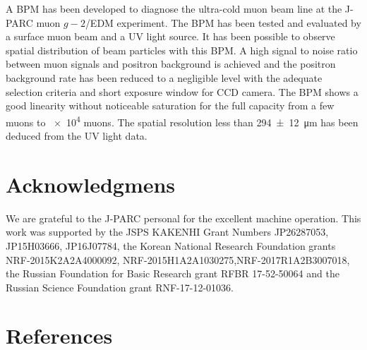 \documentclass[preprint,3p,twocolumn]{elsarticle}
\begin{document}
A BPM has been developed to diagnose the ultra-cold muon beam line at the J-PARC muon $g-2$/EDM experiment. The BPM has been tested and evaluated by a surface muon beam and a UV light source.
It has been possible to observe spatial distribution of beam particles with this BPM.
A high signal to noise ratio between muon signals and positron background is achieved and the positron background rate has been reduced to a negligible level with the adequate selection criteria and short exposure window for CCD camera.
The BPM shows a good linearity without noticeable saturation for the full capacity from a few muons to \num{e4} muons. The spatial resolution less than \SI{294\pm12}{\micro\metre} has been deduced from the UV light data.


\section*{Acknowledgmens}

We are grateful to the J-PARC personal for the excellent machine operation.
This work was supported by 
the JSPS KAKENHI Grant Numbers JP26287053, JP15H03666, JP16J07784,
the Korean National Research Foundation grants NRF-2015K2A2A4000092, NRF-2015H1A2A1030275,NRF-2017R1A2B3007018,
the Russian Foundation for Basic Research grant RFBR 17-52-50064 and
the Russian Science Foundation grant RNF-17-12-01036. 

\section*{References}


\end{document}
